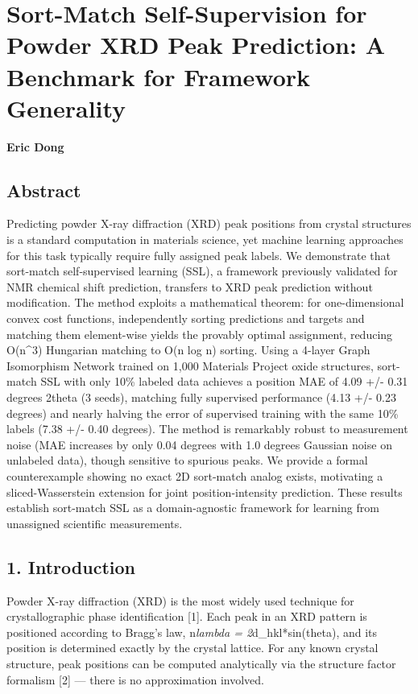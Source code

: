\documentclass[
  11pt,
]{article}
\author{}
\date{}
\begin{document}
\section{Sort-Match Self-Supervision for Powder XRD Peak Prediction: A
Benchmark for Framework
Generality}\label{sort-match-self-supervision-for-powder-xrd-peak-prediction-a-benchmark-for-framework-generality}

\textbf{Eric Dong}

\subsection{Abstract}\label{abstract}

Predicting powder X-ray diffraction (XRD) peak positions from crystal
structures is a standard computation in materials science, yet machine
learning approaches for this task typically require fully assigned peak
labels. We demonstrate that sort-match self-supervised learning (SSL), a
framework previously validated for NMR chemical shift prediction,
transfers to XRD peak prediction without modification. The method
exploits a mathematical theorem: for one-dimensional convex cost
functions, independently sorting predictions and targets and matching
them element-wise yields the provably optimal assignment, reducing
O(n\^{}3) Hungarian matching to O(n log n) sorting. Using a 4-layer
Graph Isomorphism Network trained on 1,000 Materials Project oxide
structures, sort-match SSL with only 10\% labeled data achieves a
position MAE of 4.09 +/- 0.31 degrees 2theta (3 seeds), matching fully
supervised performance (4.13 +/- 0.23 degrees) and nearly halving the
error of supervised training with the same 10\% labels (7.38 +/- 0.40
degrees). The method is remarkably robust to measurement noise (MAE
increases by only 0.04 degrees with 1.0 degrees Gaussian noise on
unlabeled data), though sensitive to spurious peaks. We provide a formal
counterexample showing no exact 2D sort-match analog exists, motivating
a sliced-Wasserstein extension for joint position-intensity prediction.
These results establish sort-match SSL as a domain-agnostic framework
for learning from unassigned scientific measurements.

\subsection{1. Introduction}\label{introduction}

Powder X-ray diffraction (XRD) is the most widely used technique for
crystallographic phase identification {[}1{]}. Each peak in an XRD
pattern is positioned according to Bragg's law, n\emph{lambda =
2}d\_hkl*sin(theta), and its position is determined exactly by the
crystal lattice. For any known crystal structure, peak positions can be
computed analytically via the structure factor formalism {[}2{]} ---
there is no approximation involved.
\end{document}
